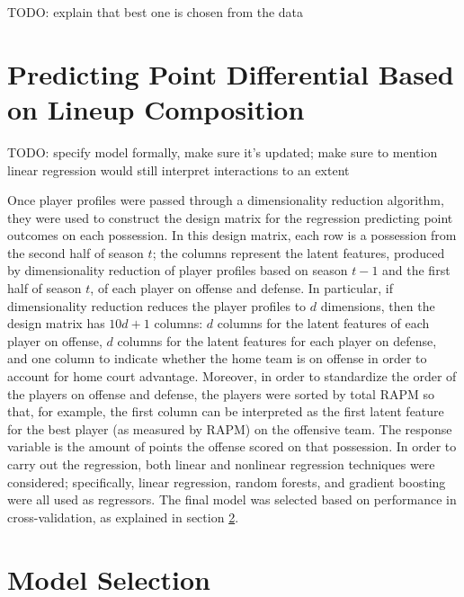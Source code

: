 TODO: explain that best one is chosen from the data

\section{Predicting Point Differential Based on Lineup Composition}
\label{sec:regress}

TODO: specify model formally, make sure it's updated; make sure to mention linear
regression would still interpret interactions to an extent

Once player profiles were passed through a dimensionality reduction algorithm, they
were used to construct the design matrix for the regression predicting point
outcomes on each possession. In this design matrix, each row is a possession from
the second half of season $t$; the columns represent the latent features, produced
by dimensionality reduction of player profiles based on season $t-1$ and the first
half of season $t$, of each player on offense and defense. In particular, if
dimensionality reduction reduces the player profiles to $d$ dimensions, then the
design matrix has $10d + 1$ columns: $d$ columns for the latent features of each
player on offense, $d$ columns for the latent features for each player on defense,
and one column to indicate whether the home team is on offense in order to account
for home court advantage. Moreover, in order to standardize the order of the players
on offense and defense, the players were sorted by total RAPM so that, for example,
the first column can be interpreted as the first latent feature for the best player
(as measured by RAPM) on the offensive team. The response variable is the amount of
points the offense scored on that possession. In order to carry out the regression,
both linear and nonlinear regression techniques were considered; specifically,
linear regression, random forests, and gradient boosting were all used as
regressors. The final model was selected based on performance in cross-validation,
as explained in section \ref{sec:mod_sel}.

\section{Model Selection}
\label{sec:mod_sel}

